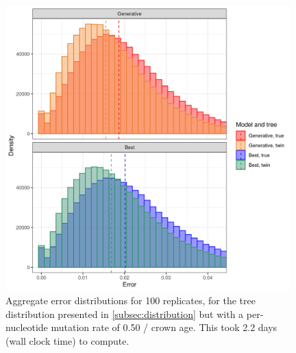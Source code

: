 \begin{figure}[H]
  \includegraphics[width=0.98\textwidth]{pirouette_example_36/errors.png}
  \caption{Aggregate error distributions for 100 replicates,
    for the tree distribution presented 
    in \ref{subsec:distribution} but with a per-nucleotide mutation rate 
    of 0.50 / crown age. 
    This took 2.2 days (wall clock time) to compute.}
  \label{fig:example_0.50_mutation_rate}
\end{figure}

